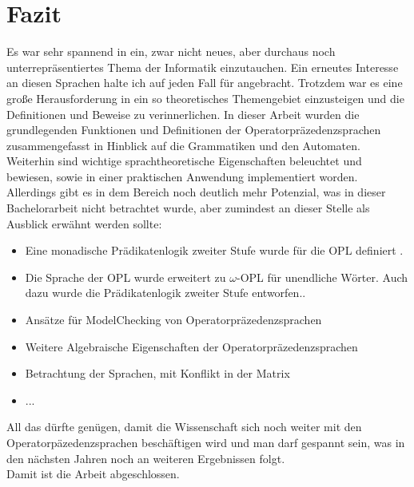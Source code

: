 \section{Fazit}
Es war sehr spannend in ein, zwar nicht neues, aber durchaus noch unterrepräsentiertes Thema der Informatik einzutauchen. Ein erneutes Interesse an diesen Sprachen halte ich auf jeden Fall für angebracht. Trotzdem war es eine große Herausforderung in ein so theoretisches Themengebiet einzusteigen und die Definitionen und Beweise zu verinnerlichen. 
In dieser Arbeit wurden die grundlegenden Funktionen und Definitionen der Operatorpräzedenzsprachen zusammengefasst in Hinblick auf die Grammatiken und den Automaten. Weiterhin sind wichtige sprachtheoretische Eigenschaften beleuchtet und bewiesen, sowie in einer praktischen Anwendung implementiert worden. Allerdings gibt es in dem Bereich noch deutlich mehr Potenzial, was in dieser Bachelorarbeit nicht betrachtet wurde, aber zumindest an dieser Stelle als Ausblick erwähnt werden sollte: \begin{itemize}
\item
Eine monadische Prädikatenlogik zweiter Stufe  wurde für die OPL definiert \cite{mso}. 
\item
Die Sprache der OPL wurde erweitert zu $\omega$-OPL für unendliche Wörter. Auch dazu wurde die Prädikatenlogik zweiter Stufe entworfen.\cite{mso}.
\item
Ansätze für ModelChecking von Operatorpräzedenzsprachen \cite{modelchecking}
\item
Weitere Algebraische Eigenschaften der Operatorpräzedenzsprachen \cite{algebraic_properties}
\item
Betrachtung der Sprachen, mit Konflikt in der Matrix
\item
...
\end{itemize}
All das dürfte genügen, damit die Wissenschaft sich noch weiter mit den Operatorpäzedenzsprachen beschäftigen wird und man darf gespannt sein, was in den nächsten Jahren noch an weiteren Ergebnissen folgt. \\
Damit ist die Arbeit abgeschlossen.